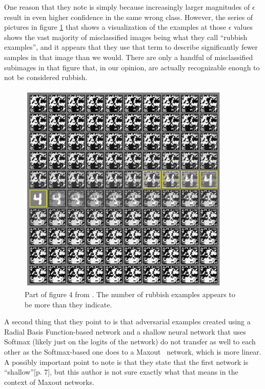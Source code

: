 One reason that they note is simply because increasingly larger magnitudes of $\epsilon$ result in
even higher confidence in the same wrong class. However, the series of pictures in figure
\ref{imagegrid} that shows a visualization of the examples at those $\epsilon$ values shows the vast
majority of misclassified images being what they call ``rubbish examples'', and it appears that they
use that term to describe significantly fewer samples in that image than we would. There are only a
handful of misclassified subimages in that figure that, in our opinion, are actually recognizable
enough to not be considered rubbish.

\begin{figure}[th]
    \begin{center}
        \includegraphics[width = 4in]{Friendly/LaTeX/figures/goodfellowdisagreement.png}
    \end{center}
    \caption{Part of figure 4 from \cite{goodfellow2015explaining}. The number of rubbish examples
             appears to be more than they indicate.}
    \label{imagegrid}
\end{figure}

A second thing that they point to is that adversarial examples created using a Radial Basis
Function-based network and a shallow neural network that uses Softmax (likely just on the logits of
the network) do not transfer as well to each other as the Softmax-based one does to a
Maxout~\cite{goodfellow2013maxout} network, which is more linear. A possibly important point to note
is that they state that the first network is ``shallow''\cite{goodfellow2015explaining}[p. 7], but
this author is not sure exactly what that means in the context of Maxout networks.